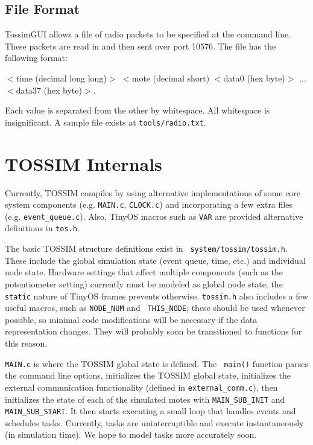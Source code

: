 \documentclass[12pt]{article}
\begin{document}
\subsection*{File Format}

TossimGUI allows a file of radio packets to be specified at the
command line. These packets are read in and then sent over port
10576. The file has the following format:

\vspace{0.1in}
$<$time (decimal long long)$>$ $<$mote (decimal short) $<$data0 (hex byte)$>$ ... $<$data37 (hex byte)$>$.
\vspace{0.1in}

Each value is separated from the other by whitespace. All whitespace
is insignificant. A sample file exists at {\tt tools/radio.txt}.

\section*{TOSSIM Internals}

Currently, TOSSIM compiles by using alternative implementations of
some core system components (e.g. {\tt MAIN.c}, {\tt CLOCK.c}) and
incorporating a few extra files (e.g. {\tt event\_queue.c}). Also,
TinyOS macros such as {\tt VAR} are provided alternative definitions
in {\tt tos.h}.

The basic TOSSIM structure definitions exist in {\tt
system/tossim/tossim.h}. These include the global simulation state
(event queue, time, etc.) and individual node state. Hardware settings
that affect multiple components (such as the potentiometer setting)
currently must be modeled as global node state; the {\tt static}
nature of TinyOS frames prevents otherwise. {\tt tossim.h} also
includes a few useful macros, such as {\tt NODE\_NUM} and {\tt
THIS\_NODE}; these should be used whenever possible, so minimal code
modifications will be necessary if the data representation
changes. They will probably soon be transitioned to functions for this
reason.

{\tt MAIN.c} is where the TOSSIM global state is defined. The {\tt
main()} function parses the command line options, initializes the
TOSSIM global state, initializes the external communication
functionality (defined in {\tt external\_comm.c}), then initializes the
state of each of the simulated motes with {\tt MAIN\_SUB\_INIT} and {\tt
MAIN\_SUB\_START}. It then starts executing a small loop that handles
events and schedules tasks. Currently, tasks are uninterruptible and
execute instantaneously (in simulation time). We hope to model tasks
more accurately soon.
\end{document}
